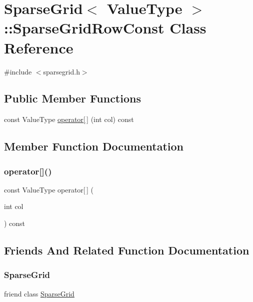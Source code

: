 \hypertarget{classSparseGrid_1_1SparseGridRowConst}{}\section{Sparse\+Grid$<$ Value\+Type $>$\+:\+:Sparse\+Grid\+Row\+Const Class Reference}
\label{classSparseGrid_1_1SparseGridRowConst}


{\ttfamily \#include $<$sparsegrid.\+h$>$}

\subsection*{Public Member Functions}
\begin{DoxyCompactItemize}
\item 
const Value\+Type \mbox{\hyperlink{classSparseGrid_1_1SparseGridRowConst_a3dc8d98145632fca91f860f4f720e219}{operator\mbox{[}$\,$\mbox{]}}} (int col) const
\end{DoxyCompactItemize}


\subsection{Member Function Documentation}
\mbox{\label{classSparseGrid_1_1SparseGridRowConst_a3dc8d98145632fca91f860f4f720e219}} 
\subsubsection{\texorpdfstring{operator[]()}{operator[]()}}
{\footnotesize\ttfamily const Value\+Type operator\mbox{[}$\,$\mbox{]} (\begin{DoxyParamCaption}\item[{int}]{col }\end{DoxyParamCaption}) const\hspace{0.3cm}{\ttfamily [inline]}}



\subsection{Friends And Related Function Documentation}
\mbox{\label{classSparseGrid_1_1SparseGridRowConst_a5d011ba21988cd3a0eba846ebda2e527}} 
\subsubsection{\texorpdfstring{Sparse\+Grid}{SparseGrid}}
{\footnotesize\ttfamily friend class \mbox{\hyperlink{classSparseGrid}{Sparse\+Grid}}\hspace{0.3cm}{\ttfamily [friend]}}

